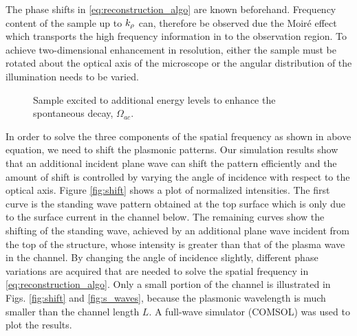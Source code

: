 \documentclass[12pt]{article}
\begin{document}
%
The phase shifts in \eqref{eq:reconstruction_algo} are known beforehand. Frequency content of the sample up to $k_{\rho}$ can, therefore be observed due the Moiré effect which transports the high frequency information in to the observation region. To achieve two-dimensional enhancement in resolution, either the sample must be rotated about the optical axis of the microscope or the angular distribution of the illumination needs to be varied.
%
\begin{figure}[b!]
  \centering
  \def\svgwidth{.5\linewidth}
  
  \caption{Sample excited to additional energy levels to enhance the spontaneous decay, $\Omega_{ac}$.}
  \label{fig:e_diag}
\end{figure}
%
In order to solve the three components of the spatial frequency as shown in above equation, we need to shift the plasmonic patterns. Our simulation results show that an additional incident plane wave can shift the pattern efficiently and the amount of shift is controlled by varying the angle of incidence with respect to the optical axis. Figure \ref{fig:shift} shows a plot of normalized intensities. The first curve is the standing wave pattern obtained at the top surface which is only due to the surface current in the channel below. The remaining curves show the shifting of the standing wave, achieved by an additional plane wave incident from the top of the structure, whose intensity is greater than that of the plasma wave in the channel. By changing the angle of incidence slightly, different phase variations are acquired that are needed to solve the spatial frequency in \eqref{eq:reconstruction_algo}. Only a small portion of the channel is illustrated in Figs. \ref{fig:shift} and
\ref{fig:s_waves}, because the plasmonic wavelength is much smaller than the channel length $L$. A full-wave simulator (COMSOL) was used to plot the results.
%
\end{document}

